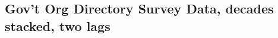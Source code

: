 \documentclass{article}
\begin{document}
{{		
		\subsection{Gov't Org Directory Survey Data, decades stacked, two lags}
		
		
		
		
		\clearpage
	}
}
\end{document}
